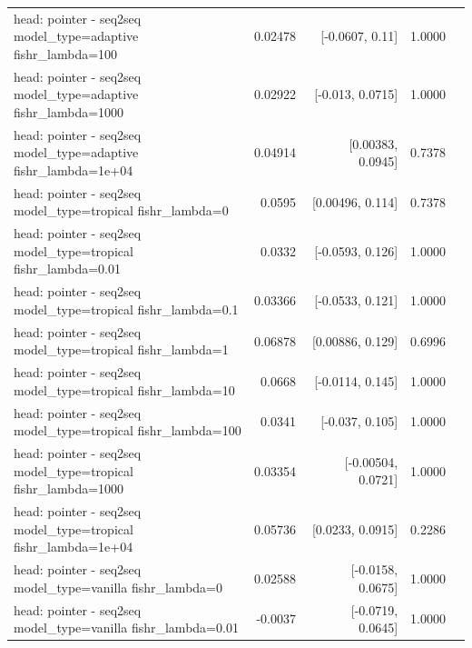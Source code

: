 \documentclass[10pt]{article}
\makeatletter
\newcommand{\stackcell}[1]{\begin{tabular}[t]{@{}l@{}}#1\end{tabular}}
\makeatother
\begin{document}
{\begin{longtable}{lrrrl}
\stackcell{head: pointer - seq2seq\\\footnotesize model\_type=adaptive fishr\_lambda=100 } & 0.02478 & [-0.0607, 0.11] & 1.0000 & \\
\stackcell{head: pointer - seq2seq\\\footnotesize model\_type=adaptive fishr\_lambda=1000 } & 0.02922 & [-0.013, 0.0715] & 1.0000 & \\
\stackcell{head: pointer - seq2seq\\\footnotesize model\_type=adaptive fishr\_lambda=1e+04 } & 0.04914 & [0.00383, 0.0945] & 0.7378 & \\
\stackcell{head: pointer - seq2seq\\\footnotesize model\_type=tropical fishr\_lambda=0 } & 0.0595 & [0.00496, 0.114] & 0.7378 & \\
\stackcell{head: pointer - seq2seq\\\footnotesize model\_type=tropical fishr\_lambda=0.01 } & 0.0332 & [-0.0593, 0.126] & 1.0000 & \\
\stackcell{head: pointer - seq2seq\\\footnotesize model\_type=tropical fishr\_lambda=0.1 } & 0.03366 & [-0.0533, 0.121] & 1.0000 & \\
\stackcell{head: pointer - seq2seq\\\footnotesize model\_type=tropical fishr\_lambda=1 } & 0.06878 & [0.00886, 0.129] & 0.6996 & \\
\stackcell{head: pointer - seq2seq\\\footnotesize model\_type=tropical fishr\_lambda=10 } & 0.0668 & [-0.0114, 0.145] & 1.0000 & \\
\stackcell{head: pointer - seq2seq\\\footnotesize model\_type=tropical fishr\_lambda=100 } & 0.0341 & [-0.037, 0.105] & 1.0000 & \\
\stackcell{head: pointer - seq2seq\\\footnotesize model\_type=tropical fishr\_lambda=1000 } & 0.03354 & [-0.00504, 0.0721] & 1.0000 & \\
\stackcell{head: pointer - seq2seq\\\footnotesize model\_type=tropical fishr\_lambda=1e+04 } & 0.05736 & [0.0233, 0.0915] & 0.2286 & \\
\stackcell{head: pointer - seq2seq\\\footnotesize model\_type=vanilla fishr\_lambda=0 } & 0.02588 & [-0.0158, 0.0675] & 1.0000 & \\
\stackcell{head: pointer - seq2seq\\\footnotesize model\_type=vanilla fishr\_lambda=0.01 } & -0.0037 & [-0.0719, 0.0645] & 1.0000 & \\

\end{longtable}}
\end{document}
